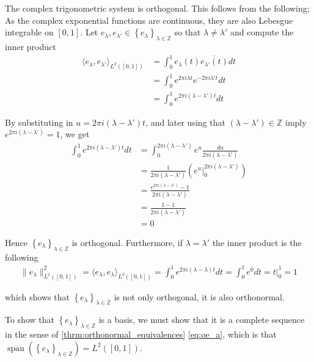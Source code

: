 \documentclass[../thesis.tex]{subfiles}
\begin{document}
The complex trigonometric system is orthogonal. This follows from the following; As the complex exponential functions are continuous, they are also Lebesgue integrable on $[0,1]$. Let $e_{\lambda}, e_{\lambda'} \in \left\{ e_{\lambda} \right\}_{\lambda\in \mathbb{Z}}$ so that $\lambda \neq \lambda'$ and compute the inner product
\begin{align*} 
\langle e_{\lambda},e_{\lambda'} \rangle_{L^2([0,1])} 
&= \int_0^1 e_{\lambda}(t)\overline{e_{\lambda'}(t)} dt\\ &= \int_0^1 e^{2 \pi i {\lambda}t} e^{-2 \pi i {\lambda'}t} dt\\
&= \int_0^1 e^{2 \pi i (\lambda-\lambda')t} dt
\end{align*}

By substituting in $u= 2 \pi i (\lambda-\lambda')t$, and later using that $(\lambda-\lambda') \in \mathbb{Z}$ imply $e^{2 \pi i (\lambda-\lambda')} = 1$,  we get
\begin{align*} 
\int_0^1 e^{2 \pi i (\lambda-\lambda')t} dt 
&= \int_0^{2 \pi i(\lambda-\lambda')} e^{u} \frac{du}{2 \pi i (\lambda-\lambda')}\\ 
&=\frac{1}{2 \pi i (\lambda-\lambda')}\left( e^u  \big| _0^{2 \pi i (\lambda-\lambda')}\right)\\
&=\frac{e^{2 \pi i(\lambda-\lambda')}-1}{2 \pi i (\lambda-\lambda')}\\ &=\frac{1-1}{2 \pi i (\lambda-\lambda')} \\
&= 0
\end{align*}

Hence $\left\{ e_{\lambda} \right\}_{\lambda\in \mathbb{Z}}$ is orthogonal. Furthermore, if  $\lambda =\lambda'$ the inner product is the following
\begin{align}\label{eq:exp_norm_one}
    \| e_\lambda \|^2_{L^2([0,1])} 
    = \langle e_{\lambda},e_{\lambda} \rangle_{L^2([0,1])} 
    = \int_0^1 e^{2 \pi i (\lambda-\lambda)t} dt
    = \int_0^1 e^{0} dt = t  \big| _0^{1}= 1
\end{align}

which shows that $\left\{ e_{\lambda} \right\}_{\lambda\in \mathbb{Z}}$ is not only orthogonal, it is also orthonormal. 


To show that $\left\{ e_{\lambda} \right\}_{\lambda\in \mathbb{Z}}$ is a basis, we must show that it is a complete sequence in the sense of \cref{thrm:orthonormal_equivalences} \cref{eq:oe_a}, which is that $\overline{\operatorname{span}} \left( \left\{ e_{\lambda} \right\}_{\lambda\in \mathbb{Z}} \right) = L^2{([0,1])}$.
\end{document}
